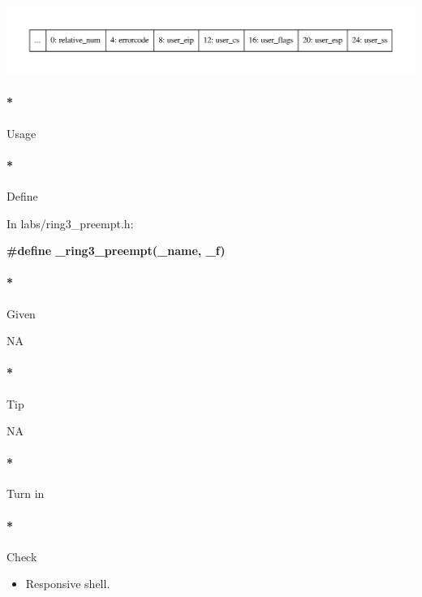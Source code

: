 \documentclass[]{article}
\newenvironment{Shaded}{}{}
\newcommand{\PreprocessorTok}[1]{\textbf{{#1}}}
\providecommand{\tightlist}{%
  \setlength{\itemsep}{0pt}\setlength{\parskip}{0pt}}
\let\oldparagraph\paragraph
\renewcommand{\paragraph}[1]{\oldparagraph{#1}\mbox{}}
\begin{document}
\includegraphics{graphviz-images/4b94c712fc5d8fc832a722cc09de70139197fc2d.pdf}

\paragraph*{Usage}\label{usage-10}

\paragraph*{Define}\label{define-10}

In labs/ring3\_preempt.h:

\begin{Shaded}
\begin{Highlighting}[]
   \PreprocessorTok{#define _ring3_preempt(_name, _f)}
\end{Highlighting}
\end{Shaded}

\paragraph*{Given}\label{given-10}

NA

\paragraph*{Tip}\label{tip-10}

NA

\paragraph*{Turn in}\label{turn-in-10}

\paragraph*{Check}\label{check-10}

\begin{itemize}
\tightlist
\item
  Responsive shell.
\end{itemize}
\end{document}
